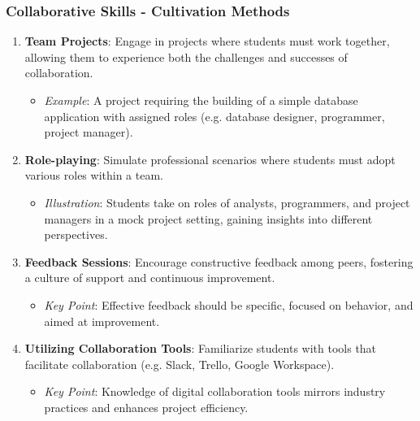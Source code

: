 \documentclass[aspectratio=169]{beamer}
\begin{document}
\begin{frame}[fragile]
    \frametitle{Collaborative Skills - Cultivation Methods}
    \begin{enumerate}
        \item \textbf{Team Projects}: Engage in projects where students must work together, allowing them to experience both the challenges and successes of collaboration. 
            \begin{itemize}
                \item \textit{Example}: A project requiring the building of a simple database application with assigned roles (e.g. database designer, programmer, project manager).
            \end{itemize}
        
        \item \textbf{Role-playing}: Simulate professional scenarios where students must adopt various roles within a team.
            \begin{itemize}
                \item \textit{Illustration}: Students take on roles of analysts, programmers, and project managers in a mock project setting, gaining insights into different perspectives.
            \end{itemize}
        
        \item \textbf{Feedback Sessions}: Encourage constructive feedback among peers, fostering a culture of support and continuous improvement.
            \begin{itemize}
                \item \textit{Key Point}: Effective feedback should be specific, focused on behavior, and aimed at improvement.
            \end{itemize}
        
        \item \textbf{Utilizing Collaboration Tools}: Familiarize students with tools that facilitate collaboration (e.g. Slack, Trello, Google Workspace).
            \begin{itemize}
                \item \textit{Key Point}: Knowledge of digital collaboration tools mirrors industry practices and enhances project efficiency.
            \end{itemize}
    \end{enumerate}
\end{frame}
\end{document}
